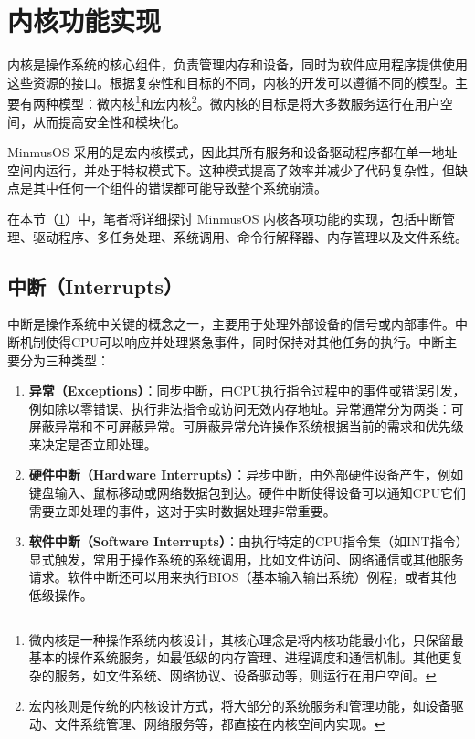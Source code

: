 \section{内核功能实现}\label{sec:KernelFunctionalityImplementation}

内核是操作系统的核心组件，负责管理内存和设备，同时为软件应用程序提供使用这些资源的接口。根据复杂性和目标的不同，内核的开发可以遵循不同的模型。主要有两种模型：微内核\footnote{微内核是一种操作系统内核设计，其核心理念是将内核功能最小化，只保留最基本的操作系统服务，如最低级的内存管理、进程调度和通信机制。其他更复杂的服务，如文件系统、网络协议、设备驱动等，则运行在用户空间。}和宏内核\footnote{宏内核则是传统的内核设计方式，将大部分的系统服务和管理功能，如设备驱动、文件系统管理、网络服务等，都直接在内核空间内实现。}。微内核的目标是将大多数服务运行在用户空间，从而提高安全性和模块化。

MinmusOS 采用的是宏内核模式，因此其所有服务和设备驱动程序都在单一地址空间内运行，并处于特权模式下。这种模式提高了效率并减少了代码复杂性，但缺点是其中任何一个组件的错误都可能导致整个系统崩溃。

在本节（\cref{sec:KernelFunctionalityImplementation}）中，笔者将详细探讨 MinmusOS 内核各项功能的实现，包括中断管理、驱动程序、多任务处理、系统调用、命令行解释器、内存管理以及文件系统。

\subsection{中断（Interrupts）}

中断是操作系统中关键的概念之一，主要用于处理外部设备的信号或内部事件。中断机制使得CPU可以响应并处理紧急事件，同时保持对其他任务的执行。中断主要分为三种类型：

\begin{enumerate}
    \item \textbf{异常（Exceptions）}：同步中断，由CPU执行指令过程中的事件或错误引发，例如除以零错误、执行非法指令或访问无效内存地址。异常通常分为两类：可屏蔽异常和不可屏蔽异常。可屏蔽异常允许操作系统根据当前的需求和优先级来决定是否立即处理。
    \item \textbf{硬件中断（Hardware Interrupts）}：异步中断，由外部硬件设备产生，例如键盘输入、鼠标移动或网络数据包到达。硬件中断使得设备可以通知CPU它们需要立即处理的事件，这对于实时数据处理非常重要。
    \item \textbf{软件中断（Software Interrupts）}：由执行特定的CPU指令集（如INT指令）显式触发，常用于操作系统的系统调用，比如文件访问、网络通信或其他服务请求。软件中断还可以用来执行BIOS（基本输入输出系统）例程，或者其他低级操作。
\end{enumerate}

